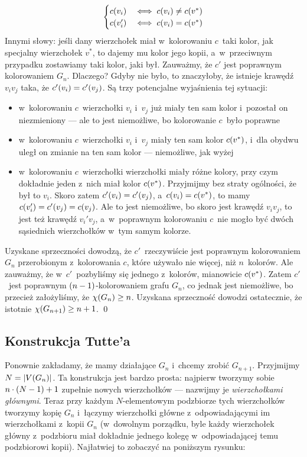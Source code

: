 \begin{itemize}
\begin{equation*}
\begin{cases}
			      c\pars{v_i}  & \iff c\pars{v_i} \neq c\pars{v^\ast} \\
			      c\pars{v_i'} & \iff c\pars{v_i} = c\pars{v^\ast}
		      \end{cases}
	      \end{equation*}
	      Innymi słowy: jeśli dany wierzchołek miał w~kolorowaniu $c$~taki kolor, jak specjalny wierzchołek $v^\ast$, to dajemy mu kolor jego kopii, a~w~przeciwnym przypadku zostawiamy taki kolor, jaki był. Zauważmy, że $c'$ jest poprawnym kolorowaniem $G_n$. Dlaczego? Gdyby nie było, to znaczyłoby, że istnieje krawędź $v_iv_j$ taka, że $c'\pars{v_i} = c'\pars{v_j}$. Są trzy potencjalne wyjaśnienia tej sytuacji:
	      \begin{itemize}
		      \item w~kolorowaniu $c$~wierzchołki $v_i$ i~$v_j$ już miały ten sam kolor i~pozostał on niezmieniony --- ale to jest niemożliwe, bo kolorowanie $c$~było poprawne
		      \item w~kolorowaniu $c$~wierzchołki $v_i$ i~$v_j$ miały ten sam kolor $c\pars{v^\ast}$, i~dla obydwu uległ on zmianie na ten sam kolor --- niemożliwe, jak wyżej
		      \item w~kolorowaniu $c$~wierzchołki wierzchołki miały różne kolory, przy czym dokładnie jeden z~nich miał kolor $c\pars{v^\ast}$. Przyjmijmy bez straty ogólności, że był to $v_i$. Skoro zatem $c'\pars{v_i} = c'\pars{v_j}$, a~$c\pars{v_i} = c\pars{v^\ast}$, to mamy $c\pars{v_i'} = c'\pars{v_j} = c\pars{v_j}$. Ale to jest niemożliwe, bo skoro jest krawędź $v_iv_j$, to jest też krawędź $v_i'v_j$, a~w~poprawnym kolorowaniu $c$~nie mogło być dwóch sąsiednich wierzchołków w~tym samym kolorze.
	      \end{itemize}
	      Uzyskane sprzeczności dowodzą, że $c'$~rzeczywiście jest poprawnym kolorowaniem $G_n$ przerobionym z~kolorowania $c$, które używało nie więcej, niż $n$~kolorów. Ale zauważmy, że w~$c'$~pozbyliśmy się  jednego z~kolorów, mianowicie $c\pars{v^\ast}$. Zatem $c'$~jest poprawnym $\left(n - 1\right)$-kolorowaniem grafu $G_n$, co jednak jest niemożliwe, bo przecież założyliśmy, że $\chi\pars{G_n} \geq n$. Uzyskana sprzeczność dowodzi ostatecznie, że istotnie $\chi\pars{G_{n + 1}} \geq n + 1$.
	      \qed
\end{itemize}
\subsection{Konstrukcja Tutte'a}
Ponownie zakładamy, że mamy działające $G_n$ i~chcemy zrobić $G_{n + 1}$. Przyjmijmy $N = \left|V\pars{G_n}\right|$. Ta konstrukcja jest bardzo prosta: najpierw tworzymy sobie $n \cdot \left(N - 1\right) + 1$ zupełnie nowych wierzchołków --- nazwijmy je \emph{wierzchołkami głównymi}. Teraz przy każdym $N$-elementowym podzbiorze tych wierzchołków tworzymy kopię $G_n$ i~łączymy wierzchołki główne z~odpowiadającymi im wierzchołkami z~kopii $G_n$ (w~dowolnym porządku, byle każdy wierzchołek główny z~podzbioru miał dokładnie jednego kolegę w~odpowiadającej temu podzbiorowi kopii). Najłatwiej to zobaczyć na poniższym rysunku:


